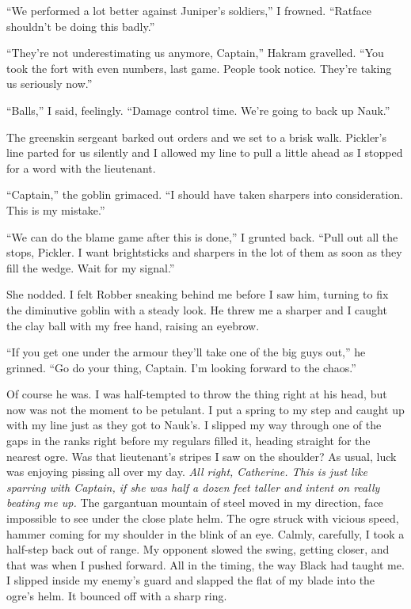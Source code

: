 \documentclass[12pt, openany]{book}
\begin{document}
“We performed a lot better against Juniper’s soldiers,” I frowned. “Ratface shouldn’t be doing this badly.”

“They’re not underestimating us anymore, Captain,” Hakram gravelled. “You took the fort with even numbers, last game. People took notice. They’re taking us seriously now.”

“Balls,” I said, feelingly. “Damage control time. We’re going to back up Nauk.”

The greenskin sergeant barked out orders and we set to a brisk walk. Pickler’s line parted for us silently and I allowed my line to pull a little ahead as I stopped for a word with the lieutenant.

“Captain,” the goblin grimaced. “I should have taken sharpers into consideration. This is my mistake.”

“We can do the blame game after this is done,” I grunted back. “Pull out all the stops, Pickler. I want brightsticks and sharpers in the lot of them as soon as they fill the wedge. Wait for my signal.”

She nodded. I felt Robber sneaking behind me before I saw him, turning to fix the diminutive goblin with a steady look. He threw me a sharper and I caught the clay ball with my free hand, raising an eyebrow.

“If you get one under the armour they’ll take one of the big guys out,” he grinned. “Go do your thing, Captain. I’m looking forward to the chaos.”

Of course he was. I was half-tempted to throw the thing right at his head, but now was not the moment to be petulant. I put a spring to my step and caught up with my line just as they got to Nauk’s. I slipped my way through one of the gaps in the ranks right before my regulars filled it, heading straight for the nearest ogre. Was that lieutenant’s stripes I saw on the shoulder? As usual, luck was enjoying pissing all over my day. \textit{All right, Catherine. This is just like sparring with Captain, if she was half a dozen feet taller and intent on really beating me up.} The gargantuan mountain of steel moved in my direction, face impossible to see under the close plate helm. The ogre struck with vicious speed, hammer coming for my shoulder in the blink of an eye. Calmly, carefully, I took a half-step back out of range. My opponent slowed the swing, getting closer, and that was when I pushed forward. All in the timing, the way Black had taught me. I slipped inside my enemy’s guard and slapped the flat of my blade into the ogre’s helm. It bounced off with a sharp ring. 
\end{document}
